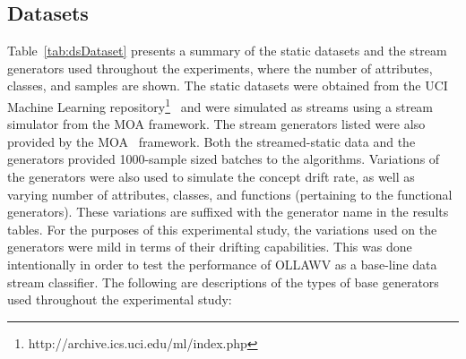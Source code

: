 \documentclass[reqno]{vcuthesis}
\numberwithin{equation}{chapter}
\begin{document}
\subsection{Datasets}
Table~\ref{tab:dsDataset} presents a summary of the static datasets and the stream generators used throughout the experiments, where the number of attributes, classes, and samples are shown. The static datasets were obtained from the UCI Machine Learning repository\footnote{http://archive.ics.uci.edu/ml/index.php}~\cite{Lichman:2013} and were simulated as streams using a stream simulator from the MOA framework. The stream generators listed were also provided by the MOA~\cite{moacite} framework. Both the streamed-static data and the generators provided 1000-sample sized batches to the algorithms. Variations of the generators were also used to simulate the concept drift rate, as well as varying number of attributes, classes, and functions (pertaining to the functional generators). These variations are suffixed with the generator name in the results tables. For the purposes of this experimental study, the variations used on the generators were mild in terms of their drifting capabilities. This was done intentionally in order to test the performance of OLLAWV as a base-line data stream classifier. The following are descriptions of the types of base generators used throughout the experimental study:
\end{document}
